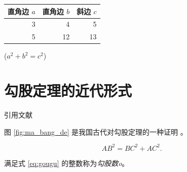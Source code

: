\documentclass[UTF8]{ctexart}
\begin{document}
\begin{table}[H]
    \begin{tabular}{|rrr|}
        \hline
        直角边 $a$ & 直角边 $b$ & 斜边 $c$ \\
        \hline
        3       & 4       & 5      \\
        5       & 12      & 13     \\
        \hline
    \end{tabular}%
    \qquad
    ($a^2 + b^2 = c^2$)
\end{table}

\section{勾股定理的近代形式}
引用文献 \cite{quanjing}

图 \ref{fig:ma_bang_de} 是我国古代对勾股定理的一种证明 \cite{quanjing}。

\begin{equation}\label{eq:gougu}
    AB^2 = BC^2 + AC^2.
\end{equation}

满足式 \eqref{eq:gougu} 的整数称为\emph{勾股数o}。

\nocite{Shiye}

\end{document}
